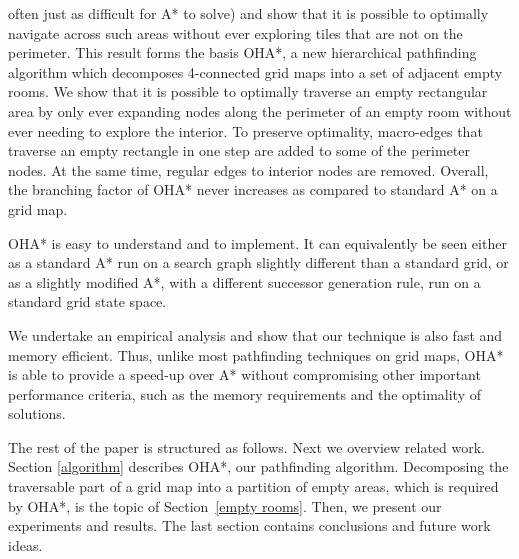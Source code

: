 often just as difficult for A* to solve) and show that it is possible to optimally navigate across 
such areas without ever exploring tiles that are not on the perimeter.
This result forms the basis OHA*, a new hierarchical pathfinding algorithm which 
decomposes 4-connected grid maps into a set of adjacent empty rooms.
We show that it is possible to optimally traverse an empty rectangular area by only ever expanding nodes along the perimeter of an empty room without ever needing to explore the interior.
To preserve optimality, macro-edges that traverse an empty rectangle in one step are added to some of the perimeter nodes. 
At the same time, regular edges to interior nodes are removed.
Overall, the branching factor of OHA* never increases as compared to standard A* on a grid map.
\par
OHA* is easy to understand and to implement. It can equivalently be seen either as
a standard A* run on a search graph slightly different than a standard grid, or
as a slightly modified A*, with a different successor generation rule,
run on a standard grid state space.
\par
We undertake an empirical analysis and show that our technique is also fast and memory efficient.
Thus, unlike most pathfinding techniques on grid maps, OHA* is able to provide a speed-up over A*
without compromising other important performance criteria, such as the memory requirements
and the optimality of solutions.

The rest of the paper is structured as follows.
Next we overview related work.
Section \ref{algorithm} describes OHA*, our pathfinding algorithm.
Decomposing the traversable part of a grid map into a partition of empty areas,
which is required by OHA*, is the topic of Section~\ref{empty rooms}.
Then, we present our experiments and results.
The last section contains conclusions and future work ideas.

